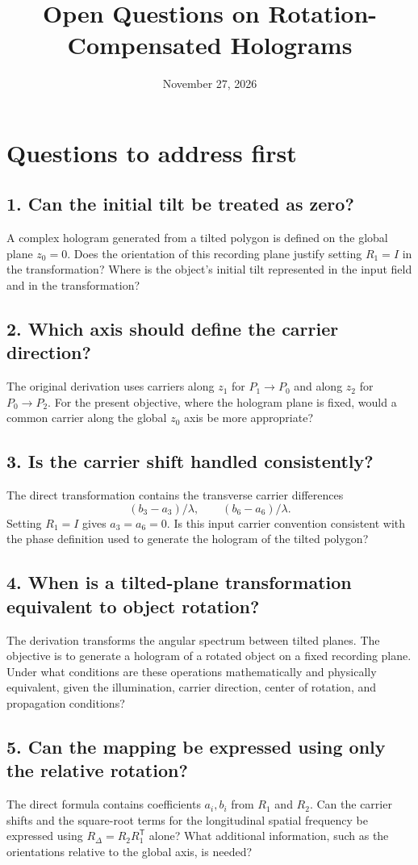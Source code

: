 \documentclass[a4paper,10pt]{article}
\title{Open Questions on Rotation-Compensated Holograms}
\author{}
\date{November 27, 2026}
\begin{document}
\maketitle
\section{Questions to address first}
\subsection*{1. Can the initial tilt be treated as zero?}
A complex hologram generated from a tilted polygon is defined on the global plane $z_0=0$. Does the orientation of this recording plane justify setting $R_1=I$ in the transformation? Where is the object's initial tilt represented in the input field and in the transformation?

\subsection*{2. Which axis should define the carrier direction?}
The original derivation uses carriers along $z_1$ for $P_1\to P_0$ and along $z_2$ for $P_0\to P_2$. For the present objective, where the hologram plane is fixed, would a common carrier along the global $z_0$ axis be more appropriate?

\subsection*{3. Is the carrier shift handled consistently?}
The direct transformation contains the transverse carrier differences
\[
 (b_3-a_3)/\lambda,\qquad (b_6-a_6)/\lambda.
\]
Setting $R_1=I$ gives $a_3=a_6=0$. Is this input carrier convention consistent with the phase definition used to generate the hologram of the tilted polygon?

\subsection*{4. When is a tilted-plane transformation equivalent to object rotation?}
The derivation transforms the angular spectrum between tilted planes. The objective is to generate a hologram of a rotated object on a fixed recording plane. Under what conditions are these operations mathematically and physically equivalent, given the illumination, carrier direction, center of rotation, and propagation conditions?

\subsection*{5. Can the mapping be expressed using only the relative rotation?}
The direct formula contains coefficients $a_i,b_i$ from $R_1$ and $R_2$. Can the carrier shifts and the square-root terms for the longitudinal spatial frequency be expressed using $R_\Delta=R_2R_1^{\mathsf T}$ alone? What additional information, such as the orientations relative to the global axis, is needed?
\end{document}
